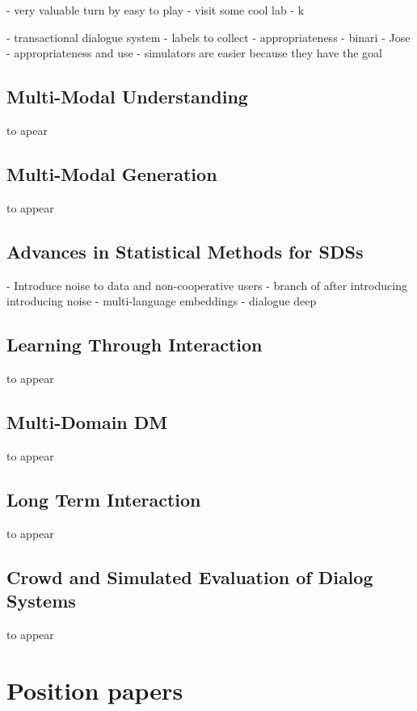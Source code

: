 \documentclass[12pt]{article}
\begin{document}
- very valuable turn by easy to play
- visit some cool lab
- k

- transactional dialogue system
- labels to collect
    - appropriateness - binari - Jose
        - appropriateness and use 
- simulators are easier because they have the goal

\subsection{Multi-Modal Understanding}
to apear
\subsection{Multi-Modal Generation}
to appear
\subsection{Advances in Statistical Methods for SDSs}
- Introduce noise to data and non-cooperative users
    - branch of after introducing introducing noise
    - multi-language embeddings
    - dialogue deep 
\subsection{Learning Through Interaction}
to appear
\subsection{Multi-Domain DM}
to appear
\subsection{Long Term Interaction}
to appear
\subsection{Crowd and Simulated Evaluation of Dialog Systems}
to appear
 

\section{Position papers}
\end{document}
